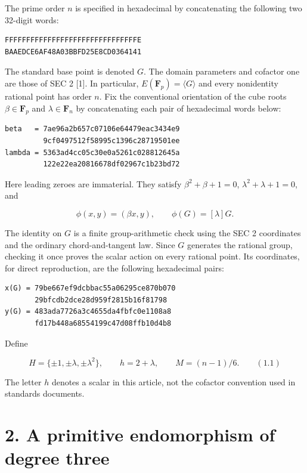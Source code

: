 \documentclass[
  11pt,
  a4paper,
]{article}
\begin{document}
The prime order \(n\) is specified in hexadecimal by concatenating the
following two 32-digit words:

\begin{verbatim}
FFFFFFFFFFFFFFFFFFFFFFFFFFFFFFFE
BAAEDCE6AF48A03BBFD25E8CD0364141
\end{verbatim}

The standard base point is denoted \(G\). The domain parameters and
cofactor one are those of SEC 2 {[}1{]}. In particular,
\(E(\mathbf F_p)=\langle G\rangle\) and every nonidentity rational point
has order \(n\). Fix the conventional orientation of the cube roots
\(\beta\in\mathbf F_p\) and \(\lambda\in\mathbf F_n\) by concatenating
each pair of hexadecimal words below:

\begin{verbatim}
beta   = 7ae96a2b657c07106e64479eac3434e9
         9cf0497512f58995c1396c28719501ee
lambda = 5363ad4cc05c30e0a5261c028812645a
         122e22ea20816678df02967c1b23bd72
\end{verbatim}

Here leading zeroes are immaterial. They satisfy \(\beta^2+\beta+1=0\),
\(\lambda^2+\lambda+1=0\), and

\[
\phi(x,y)=(\beta x,y),\qquad \phi(G)=[\lambda]G.
\]

The identity on \(G\) is a finite group-arithmetic check using the SEC 2
coordinates and the ordinary chord-and-tangent law. Since \(G\)
generates the rational group, checking it once proves the scalar action
on every rational point. Its coordinates, for direct reproduction, are
the following hexadecimal pairs:

\begin{verbatim}
x(G) = 79be667ef9dcbbac55a06295ce870b070
       29bfcdb2dce28d959f2815b16f81798
y(G) = 483ada7726a3c4655da4fbfc0e1108a8
       fd17b448a68554199c47d08ffb10d4b8
\end{verbatim}

Define

\[
H=\{\pm1,\pm\lambda,\pm\lambda^2\},\qquad h=2+\lambda,\qquad M=(n-1)/6. \qquad (1.1)
\]

The letter \(h\) denotes a scalar in this article, not the cofactor
convention used in standards documents.

\section{2. A primitive endomorphism of degree
three}\label{a-primitive-endomorphism-of-degree-three}
\end{document}

